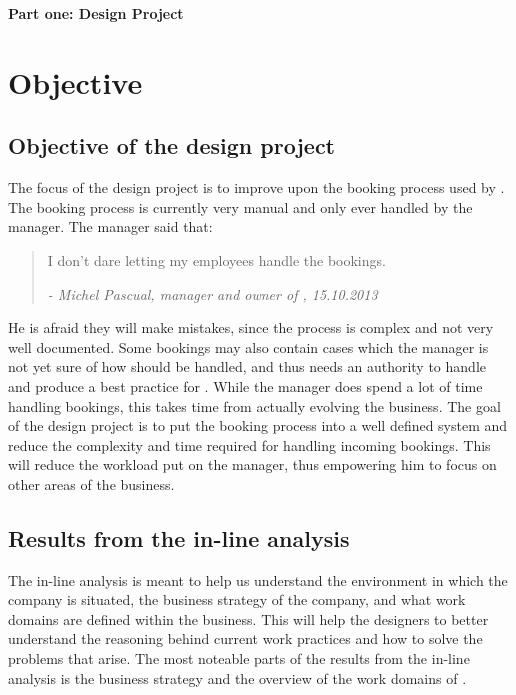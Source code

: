 \textbf{\LARGE{Part one: Design Project}}

\section{Objective}

\subsection{Objective of the design project}
The focus of the design project is to improve upon the booking process used by 
\gomonkey. The booking process is currently very manual and only ever handled by 
the manager. The manager said that: 

\begin{quotation}
I don't dare letting my employees handle the bookings.

\em - Michel Pascual, manager and owner of \gomonkey, 15.10.2013
\end{quotation}

He is afraid they will make mistakes, since the process is complex and not very 
well documented. Some bookings may also contain cases which the manager is not 
yet sure of how should be handled, and thus needs an authority to handle and  
produce a best practice for \gomonkey{}. While the manager does spend a lot of
time handling bookings, this takes time from actually evolving the business.
The goal of the design project is to put the booking process into a 
well defined system and reduce the complexity and time required for handling
incoming bookings. This will reduce the workload put on the manager, thus 
empowering him to focus on other areas of the business.

\subsection{Results from the in-line analysis}
The in-line analysis is meant to help us understand the environment in which 
the company is situated, the business strategy of the company, and what work
domains are defined within the business. This will help the designers to
better understand the reasoning behind current work practices and how to 
solve the problems that arise. The most noteable parts of the results from 
the in-line analysis is the business strategy and the overview of the work 
domains of \gomonkey{}.

